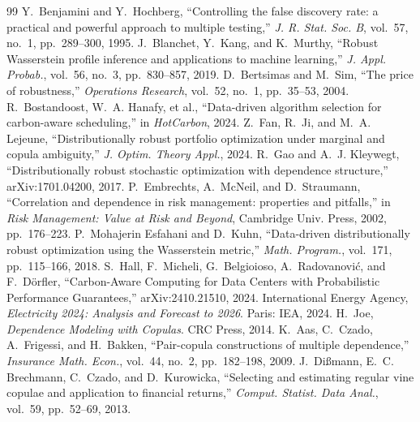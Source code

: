 \documentclass[12pt]{article}
\begin{document}
\renewcommand{\bibsection}{\section*{References}}
\begin{thebibliography}{99}\small
{} Y.~Benjamini and Y.~Hochberg, ``Controlling the false
discovery rate: a practical and powerful approach to multiple testing,'' \emph{J.
R. Stat. Soc. B}, vol.~57, no.~1, pp.~289--300, 1995.
 J.~Blanchet, Y.~Kang, and K.~Murthy, ``Robust Wasserstein
profile inference and applications to machine learning,'' \emph{J. Appl. Probab.},
vol.~56, no.~3, pp.~830--857, 2019.
 D.~Bertsimas and M.~Sim, ``The price of robustness,''
\emph{Operations Research}, vol.~52, no.~1, pp.~35--53, 2004.
 R.~Bostandoost, W.~A. Hanafy, et al., ``Data-driven
algorithm selection for carbon-aware scheduling,'' in \emph{HotCarbon}, 2024.
 Z.~Fan, R.~Ji, and M.~A. Lejeune, ``Distributionally robust
portfolio optimization under marginal and copula ambiguity,'' \emph{J. Optim.
Theory Appl.}, 2024.
 R.~Gao and A.~J. Kleywegt, ``Distributionally robust stochastic
optimization with dependence structure,'' arXiv:1701.04200, 2017.
 P.~Embrechts, A.~McNeil, and D.~Straumann, ``Correlation
and dependence in risk management: properties and pitfalls,'' in \emph{Risk
Management: Value at Risk and Beyond}, Cambridge Univ. Press, 2002, pp.~176--223.
 P.~Mohajerin Esfahani and D.~Kuhn, ``Data-driven
distributionally robust optimization using the Wasserstein metric,'' \emph{Math.
Program.}, vol.~171, pp.~115--166, 2018.
 S.~Hall, F.~Micheli, G.~Belgioioso, A.~Radovanovi\'c, and
F.~D\"orfler, ``Carbon-Aware Computing for Data Centers with Probabilistic
Performance Guarantees,'' arXiv:2410.21510, 2024.
 International Energy Agency, \emph{Electricity 2024: Analysis and
Forecast to 2026}. Paris: IEA, 2024.
 H.~Joe, \emph{Dependence Modeling with Copulas}. CRC Press, 2014.
 K.~Aas, C.~Czado, A.~Frigessi, and H.~Bakken, ``Pair-copula
constructions of multiple dependence,'' \emph{Insurance Math. Econ.}, vol.~44,
no.~2, pp.~182--198, 2009.
 J.~Di\ss mann, E.~C. Brechmann, C.~Czado, and D.~Kurowicka,
``Selecting and estimating regular vine copulae and application to financial
returns,'' \emph{Comput. Statist. Data Anal.}, vol.~59, pp.~52--69, 2013.

\end{thebibliography}
\end{document}
